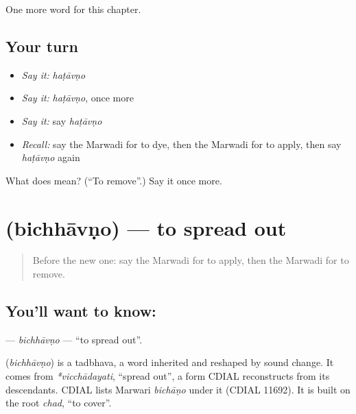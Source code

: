 \begin{grammarlens}[title={What you've built}]
One more word for this chapter.
\end{grammarlens}

\subsection*{Your turn}
\begin{itemize}
\raggedright
  \item \emph{Say it:} \emph{haṭāvṇo}
  \item \emph{Say it:} \emph{haṭāvṇo}, once more
  \item \emph{Say it:} say \emph{haṭāvṇo}
  \item \emph{Recall:} say the Marwadi for to dye, then the Marwadi for to apply, then say \emph{haṭāvṇo} again
\end{itemize}

\begin{tcolorbox}[breakable,colback=teal!4,colframe=teal!35!black,title={Before you move on}]
What does  mean? (\textquotedblleft{}To remove\textquotedblright{}.) Say it once more.
\end{tcolorbox}
\section[\texorpdfstring{\mw{बिछावणो} (bichhāvṇo)}{बिछावणो (bichhāvṇo)}]{ (bichhāvṇo) — to spread out}

\label{lesson:MW-C107-bichhavno}



\begin{quote}
Before the new one: say the Marwadi for to apply, then the Marwadi for to remove.
\end{quote}

\subsection*{You'll want to know: }
\textbf{} — \emph{bichhāvṇo} — \textquotedblleft{}to spread out\textquotedblright{}.

\begin{cousinweb}
\textbf{} (\emph{bichhāvṇo}) is a tadbhava, a word inherited and reshaped by sound change. It comes from \emph{*vicchādayati}, \textquotedblleft{}spread out\textquotedblright{}, a form CDIAL reconstructs from its descendants. CDIAL lists Marwari \emph{bichāṇo} under it (CDIAL 11692). It is built on the root \emph{chad}, \textquotedblleft{}to cover\textquotedblright{}.
\end{cousinweb}

